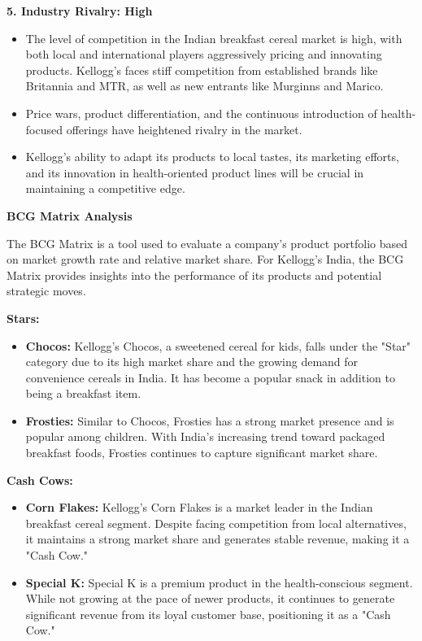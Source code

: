 \documentclass[10pt,a4paper]{book}
\begin{document}
\vspace{0.5cm}

\textbf{5. Industry Rivalry: High}
\begin{itemize}
    \item The level of competition in the Indian breakfast cereal market is high, with both local and international players aggressively pricing and innovating products. Kellogg’s faces stiff competition from established brands like Britannia and MTR, as well as new entrants like Murginns and Marico.
    \item Price wars, product differentiation, and the continuous introduction of health-focused offerings have heightened rivalry in the market.
    \item Kellogg’s ability to adapt its products to local tastes, its marketing efforts, and its innovation in health-oriented product lines will be crucial in maintaining a competitive edge.
\end{itemize}

\vspace{0.5cm}

\begin{center} 
\textbf{BCG Matrix Analysis}
\end{center} 

The BCG Matrix is a tool used to evaluate a company’s product portfolio based on market growth rate and relative market share. For Kellogg’s India, the BCG Matrix provides insights into the performance of its products and potential strategic moves.

\vspace{0.5cm}

\textbf{Stars:}
\begin{itemize}
    \item \textbf{Chocos:} Kellogg's Chocos, a sweetened cereal for kids, falls under the "Star" category due to its high market share and the growing demand for convenience cereals in India. It has become a popular snack in addition to being a breakfast item.
    \item \textbf{Frosties:} Similar to Chocos, Frosties has a strong market presence and is popular among children. With India’s increasing trend toward packaged breakfast foods, Frosties continues to capture significant market share.
\end{itemize}

\vspace{0.5cm}

\textbf{Cash Cows:}
\begin{itemize}
    \item \textbf{Corn Flakes:} Kellogg’s Corn Flakes is a market leader in the Indian breakfast cereal segment. Despite facing competition from local alternatives, it maintains a strong market share and generates stable revenue, making it a "Cash Cow."
    \item \textbf{Special K:} Special K is a premium product in the health-conscious segment. While not growing at the pace of newer products, it continues to generate significant revenue from its loyal customer base, positioning it as a "Cash Cow."
\end{itemize}
\end{document}
